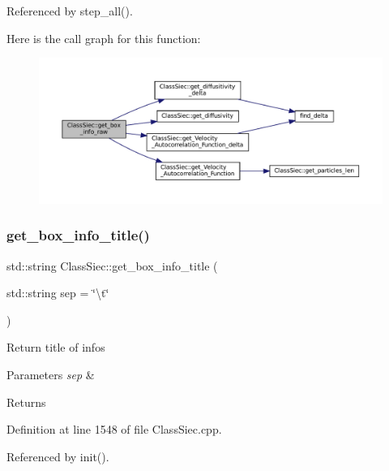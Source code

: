 Referenced by step\+\_\+all().

Here is the call graph for this function\+:\nopagebreak
\begin{figure}[H]
\begin{center}
\leavevmode
\includegraphics[width=350pt]{classClassSiec_a1e4fd45f66e131050359072b706f7608_cgraph}
\end{center}
\end{figure}
\mbox{\label{classClassSiec_a653414664f006ee8cbfb8d101c8e8e62}} 
\subsubsection{\texorpdfstring{get\+\_\+box\+\_\+info\+\_\+title()}{get\_box\_info\_title()}}
{\footnotesize\ttfamily std\+::string Class\+Siec\+::get\+\_\+box\+\_\+info\+\_\+title (\begin{DoxyParamCaption}\item[{std\+::string}]{sep = {\ttfamily \char`\"{}\textbackslash{}t\char`\"{}} }\end{DoxyParamCaption})}

Return title of infos 
\begin{DoxyParams}{Parameters}
{\em sep} & \\
\hline
\end{DoxyParams}
\begin{DoxyReturn}{Returns}

\end{DoxyReturn}


Definition at line 1548 of file Class\+Siec.\+cpp.



Referenced by init().

\mbox{\label{classClassSiec_a44e57165a1c37b9f9073fa0334e2878d}} 
